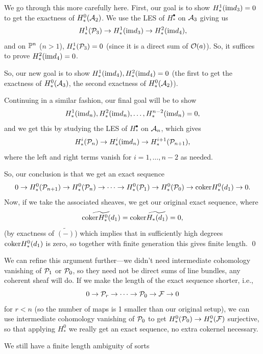 \documentclass[12pt]{article}
\begin{document}
We go through this more carefully here. First, our goal is to show $H_*^1(\im d_3)=0$ to get the exactness of $H_*^0(\cA_2)$. We use the LES of $H_*^\bullet$ on $\cA_3$ giving us
\[H_*^1(\cP_3) \to H_*^1(\im d_3) \to H_*^2(\im d_4),\]
and on $\P^n$ ($n>1$), $H_*^1(\cP_3)=0$ (since it is a direct sum of $\cO(a)$). So, it suffices to prove $H_*^2(\im d_4)=0$.

So, our new goal is to show $H_*^1(\im d_4), H_*^2(\im d_4) = 0$ (the first to get the exactness of $H_*^0(\cA_3)$, the second exactness of $H_*^0(\cA_2)$).

Continuing in a similar fashion, our final goal will be to show
\[H_*^1(\im d_n), H_*^2(\im d_n), \dots, H_*^{n-2}(\im d_n)=0,\]
and we get this by studying the LES of $H_*^\bullet$ on $\cA_n$, which gives
\[H_*^i(\cP_n) \to H_*^i(\im d_n) \to H_*^{i+1}(\cP_{n+1}),\]
where the left and right terms vanish for $i=1,\dots,n-2$ as needed.

So, our conclusion is that we get an exact sequence
\[0 \to H_*^0(\cP_{n+1}) \to H_*^0(\cP_{n}) \to \cdots \to H_*^0(\cP_{1}) \to H_*^0(\cP_{0}) \to \coker H_*^0(d_1) \to 0.\]
Now, if we take the associated sheaves, we get our original exact sequence, where
\[\tilde{\coker H_*^0(d_1)} = \coker \tilde{H_*(d_1)} = 0,\]
(by exactness of $\tilde{(-)}$) which implies that in sufficiently high degrees $\coker H_*^0(d_1)$ is zero, so together with finite generation this gives finite length. \qed

We can refine this argument further---we didn't need intermediate cohomology vanishing of $\cP_1$ or $\cP_0$, so they need not be direct sums of line bundles, any coherent sheaf will do. If we make the length of the exact sequence shorter, i.e.,
\[0\to \cP_r \to \cdots \to \cP_0 \to \cF \to 0\]
for $r<n$ (so the number of maps is 1 smaller than our original setup), we can use intermediate cohomology vanishing of $\cP_0$ to get $H_*^0(\cP_0) \to H_*^0(\cF)$ surjective, so that applying $H_*^0$ we really get an exact sequence, no extra cokernel necessary.

\begin{rmk}
    We still have a finite length ambiguity of sorts
\end{rmk}


\end{document}
